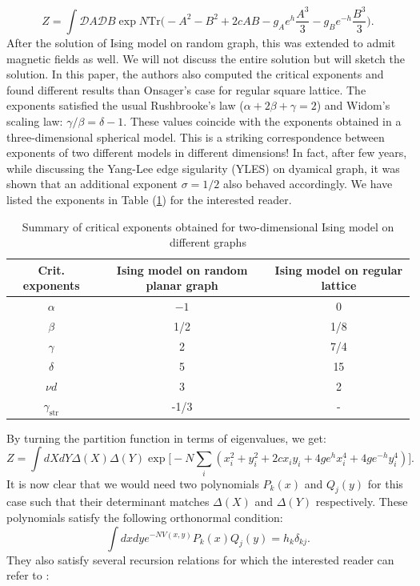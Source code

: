 \documentclass[11pt]{article}
\begin{document}
\begin{equation}
	\label{eq:RIsing1} 
	Z = \int \mathcal{D}A \mathcal{D}B \exp N \mbox{Tr} \Bigg(-A^2 -B^2 + 2c AB -g_{A}e^{h} \frac{A^3}{3} 
	- g_{B}e^{-h} \frac{B^3}{3}  \Bigg). 
\end{equation}
After the solution of Ising model on random graph, this was extended to admit magnetic fields
\cite{Boulatov:1986sb} as well. We will not discuss the entire solution but will 
sketch the solution. In this paper, the authors also computed the critical exponents 
and found different results than Onsager's case for regular square lattice. 
The exponents satisfied the usual Rushbrooke's law ($\alpha + 2\beta+\gamma=2$) 
and Widom's scaling law: $\gamma/\beta = \delta -1$. 
These values coincide with the  exponents obtained in a three-dimensional spherical model. 
This is a striking correspondence between exponents of two different models in different dimensions! 
In fact, after few years, while discussing the Yang-Lee edge sigularity (YLES) on dyamical graph, 
it was shown that an additional exponent $\sigma =1/2$ 
also behaved accordingly. 
We have listed the exponents in Table (\ref{table:crit_exp}) for the interested reader.
\begin{table} 
	\begin{center} 
\begin{tabular}{|c|c|c|}
	\hline Crit. exponents & Ising model on random planar graph & Ising model on regular lattice \\
	\hline$\alpha$ & $-1$ & 0 \\
	$\beta$ & 1/2 & 1/8 \\
	$\gamma$ & 2 & 7/4 \\
	$\delta$ & 5 & 15 \\
	$\nu d$ & 3 & 2 \\
	$\gamma_{\text {str}}$ & -1/3 & - \\
	\hline
\end{tabular}
\end{center} 
	\caption{Summary of critical exponents obtained for two-dimensional Ising model on different graphs} 
	\label{table:crit_exp}
	\end{table} 
By turning the partition function in terms of eigenvalues, we get:
\begin{equation}
	Z = \int dX dY \Delta(X) \Delta(Y)
	 \exp \Big[-N \sum_{i} (x_{i}^2 + y_{i}^{2} +2c x_{i}y_{i} + 4ge^{h}x_{i}^{4} + 4ge^{-h}y_{i}^4) \Big].
	\end{equation}
It is now clear that we would need two polynomials $P_{k}(x)$ and $Q_{j}(y)$ for this case 
such that their determinant matches $\Delta(X)$ and $\Delta(Y)$ respectively. 
These polynomials satisfy the following orthonormal condition: 
\begin{equation}
\int dx dy e^{-N V(x,y)} P_{k}(x) Q_{j}(y) = h_{k} \delta_{kj}. 
\end{equation}
They also satisfy several recursion relations for which the interested reader can refer to 
\cite{Boulatov:1986sb}:
\end{document}

